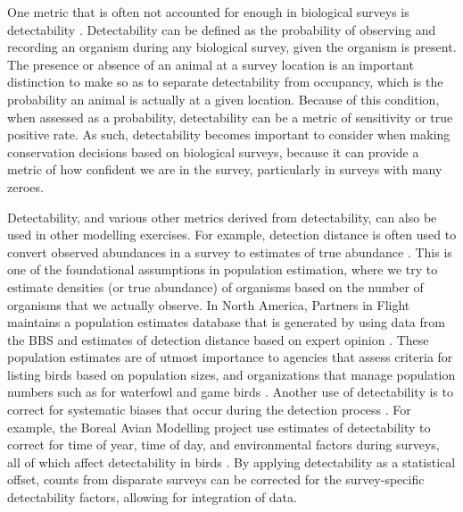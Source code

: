 \par One metric that is often not accounted for enough in biological surveys is detectability \citep{bennett_how_2024}.
Detectability can be defined as the probability of observing and recording an organism during any biological survey, given the organism is present.
The presence or absence of an animal at a survey location is an important distinction to make so as to separate detectability from occupancy, which is the probability an animal is actually at a given location.
Because of this condition, when assessed as a probability, detectability can be a metric of sensitivity or true positive rate.
As such, detectability becomes important to consider when making conservation decisions based on biological surveys, because it can provide a metric of how confident we are in the survey, particularly in surveys with many zeroes.

\par Detectability, and various other metrics derived from detectability, can also be used in other modelling exercises.
For example, detection distance is often used to convert observed abundances in a survey to estimates of true abundance \citep{buckland_introduction_2001, buckland_distance_2015}.
This is one of the foundational assumptions in population estimation, where we try to estimate densities (or true abundance) of organisms based on the number of organisms that we actually observe.
In North America, Partners in Flight maintains a population estimates database that is generated by using data from the BBS and estimates of detection distance based on expert opinion \citep{will_handbook_2020, stanton_estimating_2019}.
These population estimates are of utmost importance to agencies that assess criteria for listing birds based on population sizes, and organizations that manage population numbers such as for waterfowl and game birds \citep{canadian_wildlife_service_waterfowl_committee_population_2022}.
Another use of detectability is to correct for systematic biases that occur during the detection process \citep{johnson_defense_2008, solymos_calibrating_2013}.
For example, the Boreal Avian Modelling project use estimates of detectability to correct for time of year, time of day, and environmental factors during surveys, all of which affect detectability in birds \cite{solymos_lessons_2020, solymos_evaluating_2018, marsh_correcting_1989}.
By applying detectability as a statistical offset, counts from disparate surveys can be corrected for the survey-specific detectability factors, allowing for integration of data.

